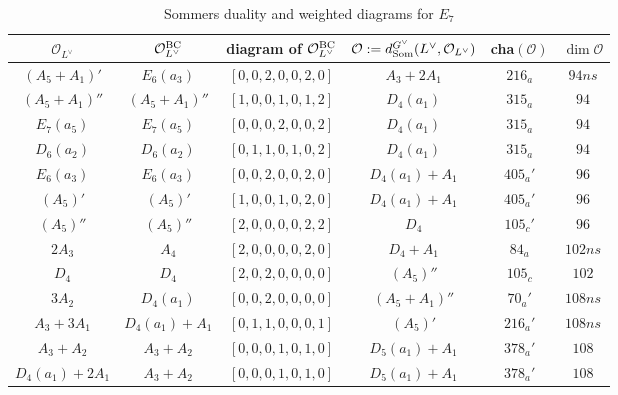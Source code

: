 \documentclass[reqno,12pt]{amsart}
\numberwithin{equation}{section}
\theoremstyle{plain}
\theoremstyle{definition}
\begin{document}
\begin{table}[htbp]\caption{Sommers duality and weighted diagrams for $ E_7$ }
	\label{tabchare7}
	\centering
	\renewcommand{\arraystretch}{1.3}
	\setlength\tabcolsep{5pt}
{	\begin{tabular}{|c|c|c|c|c|c|}
		\hline $\mathcal{O}_{L^\vee}$  & $\mathcal{O}_{L^\vee}^{\rm BC} $ & diagram of $\mathcal{O}_{L^\vee}^{\rm BC} $ &$\mathcal{O}:=d_{\rm Som}^{G^\vee}(L^\vee, \mathcal{O}_{L^\vee})$ &  cha$(\mathcal{O})$&  $\dim \mathcal{O}$ \\ \hline

$(A_5+A_1)'$ &$E_6(a_3)$
&$[0,0,2,0,0,2,0]$& $A_3+2A_1$  & $ 216_a$  &   $94ns$ \\
$(A_5+A_1)''$ 
&$(A_5+A_1)''$ 
&$[1,0,0,1,0,1,2]$&$D_4(a_1)$  &  $315_a$  &   $94$ \\
$E_7(a_5)$ 
&$E_7(a_5)$ 
&$[0,0,0,2,0,0,2]$& $D_4(a_1)$  & $315_a$  &   $94$ \\
$D_6(a_2)$ 
&$D_6(a_2)$ 
&$[0,1,1,0,1,0,2]$& $D_4(a_1)$  & $315_a$  &   $94$ \\
\hline


$E_6(a_3)$ 
& $E_6(a_3)$ 
&$[0,0,2,0,0,2,0]$&$D_4(a_1)+A_1$  & $ 405_a'$  &   $96$ \\
$(A_5)'$ 
&$(A_5)'$ 
&$[1,0,0,1,0,2,0]$& $D_4(a_1)+A_1$  &  $ 405_a'$  &  $96$ \\
$(A_5)''$ 
&$(A_5)''$ 
&$[2,0,0,0,0,2,2]$& $D_4$  & $ 105_c'$  &   $96$ \\
\hline



$2A_3$ 
&$A_4$&$[2,0,0,0,0,2,0]$& $D_4+A_1$  & $ 84_a$  &   $102ns$ \\
$D_4$ 
& $D_4$ 
&$[2,0,2,0,0,0,0]$&$(A_5)''$  &  $ 105_c$  &   $102$ \\
\hline



$3A_2$ 
&$D_4(a_1)$  &$[0,0,2,0,0,0,0]$& $(A_5+A_1)''$  &  $ 70_a'$  &   $108ns$ \\
$A_3+3A_1$ &$D_4(a_1)+A_1$
&$[0,1,1,0,0,0,1]$& $(A_5)'$  & $ 216_a'$  &   $108ns$ \\
$A_3+A_2$ 
& $A_3+A_2$ 
&$[0,0,0,1,0,1,0]$&$D_5(a_1)+A_1$  &  $ 378_a'$  &  $108$ \\
$D_4(a_1)+2A_1$ 
&  $A_3+A_2$ 
&$[0,0,0,1,0,1,0]$&   $D_5(a_1)+A_1$  &   $ 378_a'$  &  $108$ \\
\hline






\end{tabular}}
\end{table}
\end{document}

